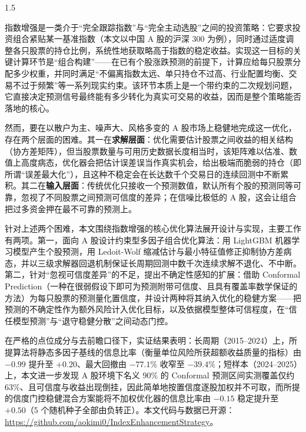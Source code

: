 

\begin{zhaiyao}
\begin{spacing}{1.5}
{
指数增强是一类介于``完全跟踪指数''与``完全主动选股''之间的投资策略：它要求投资组合紧贴某一基准指数（本文以中国 A 股的沪深 300 为例），同时通过适度调整各只股票的持仓比例，系统性地获取略高于指数的稳定收益。实现这一目标的关键计算环节是``组合构建''——在已有个股涨跌预测的前提下，计算应给每只股票分配多少权重，并同时满足``不偏离指数太远、单只持仓不过高、行业配置均衡、交易不过于频繁''等一系列现实约束。该环节本质上是一个带约束的二次规划问题，它直接决定预测信号最终能有多少转化为真实可交易的收益，因而是整个策略能否落地的核心。

然而，要在以散户为主、噪声大、风格多变的 A 股市场上稳健地完成这一优化，存在两个层面的困难。其一在\textbf{求解层面}：优化需要估计股票之间收益的相关结构（协方差矩阵），但当股票数量与可用历史数据长度相当时，该矩阵难以估准、数值上高度病态，优化器会把估计误差误当作真实机会，给出极端而脆弱的持仓（即所谓``误差最大化''），且这种不稳定会在长达数千个交易日的连续回测中不断累积。其二在\textbf{输入层面}：传统优化只接收一个预测数值，默认所有个股的预测同等可靠，忽视了不同股票之间预测可信度的差异；在信噪比极低的 A 股，这会让组合把过多资金押在最不可靠的预测上。

针对上述两个困难，本文围绕指数增强的核心优化算法展开设计与实现，主要工作有两项。第一，面向 A 股设计约束型多因子组合优化算法：用 LightGBM 机器学习模型产生个股预测，用 Ledoit-Wolf 缩减估计与最小特征值修正抑制协方差病态，并以三级求解器回退机制保证长周期回测中数千次连续求解不退化、不中断。第二，针对``忽视可信度差异''的不足，提出不确定性感知的扩展：借助 Conformal Prediction（一种在很弱假设下即可为预测附带可信度、且具有覆盖率数学保证的方法）为每只股票的预测量化置信度，并设计两种将其纳入优化的稳健方案——把预测的不确定性作为额外风险计入优化目标，以及依据模型整体可信程度，在``信任模型预测''与``退守稳健分散''之间动态门控。

在严格的点位成分与去前瞻口径下，实证结果表明：长周期（2015--2024）上，所提算法将静态多因子基线的信息比率（衡量单位风险所获超额收益质量的指标）由 $-0.99$ 提升至 $+0.20$、最大回撤由 $-77.1\%$ 收窄至 $-39.4\%$；短样本（2024--2025）上，本文进一步发现 A 股环境下名义 $90\%$ 的 Conformal 预测区间实测覆盖仅约 $63\%$、且可信度与收益出现倒挂，因此简单地按置信度逐股加权并不可取，而所提的信度门控稳健混合方案能将不加权优化器的信息比率由 $-0.15$ 稳定提升至 $+0.50$（5 个随机种子全部由负转正）。本文代码与数据已开源：\url{https://github.com/aokimi0/IndexEnhancementStrategy}。
}

\end{spacing}
\end{zhaiyao}




